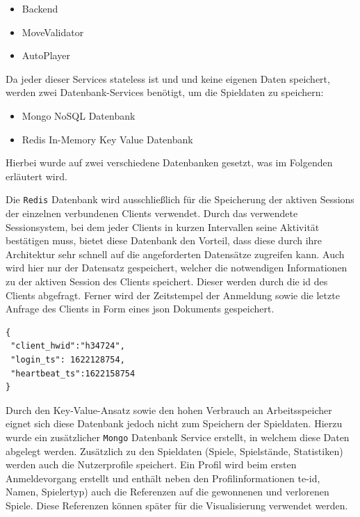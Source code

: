 \begin{itemize}
\tightlist
\item
  Backend
\item
  MoveValidator
\item
  AutoPlayer
\end{itemize}

Da jeder dieser Services stateless ist und und keine eigenen Daten
speichert, werden zwei Datenbank-Services benötigt, um die Spieldaten zu
speichern:

\begin{itemize}
\tightlist
\item
  Mongo NoSQL Datenbank
\item
  Redis In-Memory Key Value Datenbank
\end{itemize}

Hierbei wurde auf zwei verschiedene Datenbanken gesetzt, was im
Folgenden erläutert wird.

Die \passthrough{\lstinline!Redis!} \cite{redis} Datenbank wird
ausschließlich für die Speicherung der aktiven Sessions der einzelnen
verbundenen Clients verwendet. Durch das verwendete Sessionsystem, bei
dem jeder Clients in kurzen Intervallen seine Aktivität bestätigen muss,
bietet diese Datenbank den Vorteil, dass diese durch ihre Architektur
sehr schnell auf die angeforderten Datensätze zugreifen kann. Auch wird
hier nur der Datensatz gespeichert, welcher die notwendigen
Informationen zu der aktiven Session des Clients speichert. Dieser
werden durch die \gls{id} des Clients abgefragt. Ferner wird der
Zeitstempel der Anmeldung sowie die letzte Anfrage des Clients in Form
eines \gls{json} Dokuments gespeichert.

\begin{lstlisting}
{
 "client_hwid":"h34724",
 "login_ts": 1622128754,
 "heartbeat_ts":1622158754
}
\end{lstlisting}

Durch den Key-Value-Ansatz sowie den hohen Verbrauch an Arbeitsspeicher
eignet sich diese Datenbank jedoch nicht zum Speichern der Spieldaten.
Hierzu wurde ein zusätzlicher \passthrough{\lstinline!Mongo!}
\cite{mogodb} Datenbank Service erstellt, in welchem diese Daten
abgelegt werden. Zusätzlich zu den Spieldaten (Spiele, Spielstände,
Statistiken) werden auch die Nutzerprofile speichert. Ein Profil wird
beim ersten Anmeldevorgang erstellt und enthält neben den
Profilinformationen te-\gls{id}, Namen, Spielertyp) auch die Referenzen
auf die gewonnenen und verlorenen Spiele. Diese Referenzen können später
für die Visualisierung verwendet werden.

